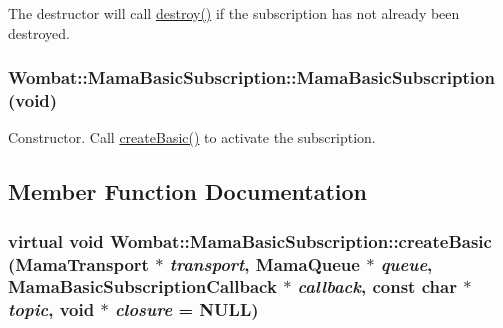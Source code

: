 The destructor will call {\ttfamily \hyperlink{classWombat_1_1MamaBasicSubscription_a296c25c10faa885e408e064a626ce3dd}{destroy()}} if the subscription has not already been destroyed. \hypertarget{classWombat_1_1MamaBasicSubscription_a337b175ab4011344f8cf47bccdc7916d}{
\subsubsection[{MamaBasicSubscription}]{\setlength{\rightskip}{0pt plus 5cm}Wombat::MamaBasicSubscription::MamaBasicSubscription (void)}}
\label{classWombat_1_1MamaBasicSubscription_a337b175ab4011344f8cf47bccdc7916d}


Constructor. Call \hyperlink{classWombat_1_1MamaBasicSubscription_a1313d7a4e6ca044f2b1a71ebad9ff382}{createBasic()} to activate the subscription. 

\subsection{Member Function Documentation}
\hypertarget{classWombat_1_1MamaBasicSubscription_a1313d7a4e6ca044f2b1a71ebad9ff382}{
\subsubsection[{createBasic}]{\setlength{\rightskip}{0pt plus 5cm}virtual void Wombat::MamaBasicSubscription::createBasic ({\bf MamaTransport} $\ast$ {\em transport}, \/  {\bf MamaQueue} $\ast$ {\em queue}, \/  {\bf MamaBasicSubscriptionCallback} $\ast$ {\em callback}, \/  const char $\ast$ {\em topic}, \/  void $\ast$ {\em closure} = {\ttfamily NULL})}}
\label{classWombat_1_1MamaBasicSubscription_a1313d7a4e6ca044f2b1a71ebad9ff382}


